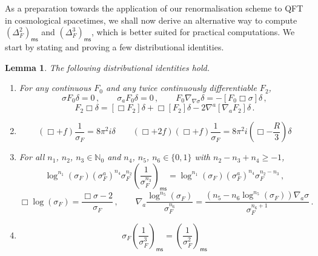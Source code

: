 \documentclass[10pt]{book}
\newcommand{\ms}{\mathsf{ms}}
\theoremstyle{break}
\newtheorem{lemma}{Lemma}
\begin{document}
As a preparation towards the application of our renormalisation scheme to QFT in cosmological spacetimes, we shall now derive an alternative way to compute $\left(\Delta^2_F\right)_\ms$ and $\left(\Delta^3_F\right)_\ms$, which is better suited for practical computations. We start by stating and proving a few distributional identities.
\begin{lemma}
The following distributional identities hold.
\begin{enumerate}
\item For any continuous $F_0$ and any twice continuously differentiable $F_2$, 
$$\sigma F_0 \delta = 0\,,\qquad \sigma_a F_0 \delta = 0\,,\qquad F_0\nabla_{\nabla\sigma}\delta =-[F_0 \Box \sigma]\delta\,,$$ 
$$F_2 \Box\delta=[\Box F_2]\delta+\Box [F_2]\delta - 2\nabla^a[\nabla_aF_2]\delta\,.$$
\item $$(\Box+f)\frac{1}{\sigma_F}=8\pi^2i\delta\qquad(\Box+2f)(\Box+f)\frac{1}{\sigma_F}=8\pi^2i\left(\Box-\frac R3\right)\delta$$
\item For all $n_1$, $n_2$, $n_3\in\mathbb{N}_0$ and $n_4$, $n_5$, $n_6\in\{0,1\}$ with $n_2-n_3+n_4\ge-1$,  $$\log^{n_1}\!\!\left(\sigma_F\right)(\sigma^a_F)^{n_4} \sigma^{n_2}_F \left(\frac{1}{\sigma_F^{n_3}}\right)_\ms= \log^{n_1}\!\!\left(\sigma_F\right) (\sigma^a_F)^{n_4}\sigma^{n_2-n_3}_F\,,$$
$$\Box \log (\sigma_F) = \frac{\Box \sigma -2}{\sigma_F}\,,\qquad \nabla_a\frac{\log^{n_5}(\sigma_F)}{\sigma^{n_6}_F}=\frac{\left(n_5-n_6\log^{n_5} (\sigma_F)\right)\nabla_a \sigma}{\sigma^{n_6+1}_F}\,.$$ 
\item $$\sigma_F \left(\frac{1}{\sigma_F^3}\right)_\ms=\left(\frac{1}{\sigma_F^2}\right)_\ms$$
\end{enumerate}
\end{lemma}
\end{document}
